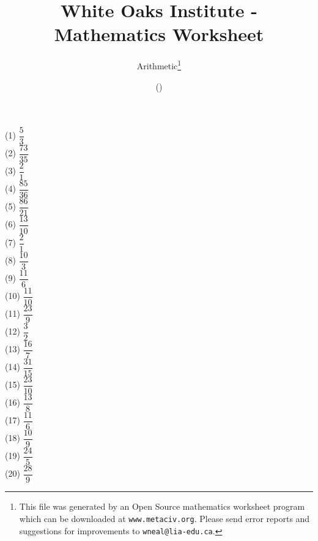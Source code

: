 \documentclass[letter]{article}
\begin{document}
\title{White Oaks Institute - Mathematics Worksheet}
\author{Arithmetic\thanks{This file was generated by an \textsf{Open Source} mathematics worksheet program which can be downloaded at \texttt{www.metaciv.org}. Please send error reports and suggestions for improvements to \texttt{wneal@lia-edu.ca}.}}
\date{\XCfileversion{} (\XCfiledate)}
\maketitle
\setlength{\parskip}{12mm plus 4mm minus 4mm}\setlength{\parindent}{0cm}\begin{multicols}{2}(1) $\dfrac{5}{3}$\\(2) $\dfrac{73}{35}$\\(3) $\dfrac{2}{1}$\\(4) $\dfrac{85}{36}$\\(5) $\dfrac{86}{21}$\\(6) $\dfrac{13}{10}$\\(7) $\dfrac{2}{1}$\\(8) $\dfrac{10}{3}$\\(9) $\dfrac{11}{6}$\\(10) $\dfrac{11}{10}$\\(11) $\dfrac{23}{9}$\\(12) $\dfrac{3}{2}$\\(13) $\dfrac{16}{7}$\\(14) $\dfrac{31}{15}$\\(15) $\dfrac{23}{10}$\\(16) $\dfrac{13}{8}$\\(17) $\dfrac{11}{6}$\\(18) $\dfrac{10}{9}$\\(19) $\dfrac{24}{5}$\\(20) $\dfrac{28}{9}$\\\end{multicols}
\end{document}
